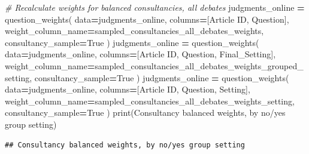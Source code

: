 \documentclass[
]{article}
\newenvironment{Shaded}{\begin{snugshade}}{\end{snugshade}}
\newcommand{\BuiltInTok}[1]{#1}
\newcommand{\CommentTok}[1]{\textcolor[rgb]{0.56,0.35,0.01}{\textit{#1}}}
\newcommand{\NormalTok}[1]{#1}
\newcommand{\OperatorTok}[1]{\textcolor[rgb]{0.81,0.36,0.00}{\textbf{#1}}}
\newcommand{\StringTok}[1]{\textcolor[rgb]{0.31,0.60,0.02}{#1}}
\newcommand{\VariableTok}[1]{\textcolor[rgb]{0.00,0.00,0.00}{#1}}
\begin{document}
\begin{Shaded}
\begin{Highlighting}[]
\CommentTok{\# Recalculate weights for balanced consultancies, all debates}
\NormalTok{judgments\_online }\OperatorTok{=}\NormalTok{ question\_weights(}
\NormalTok{    data}\OperatorTok{=}\NormalTok{judgments\_online, }
\NormalTok{    columns}\OperatorTok{=}\NormalTok{[}\StringTok{\textquotesingle{}Article ID\textquotesingle{}}\NormalTok{, }\StringTok{\textquotesingle{}Question\textquotesingle{}}\NormalTok{], }
\NormalTok{    weight\_column\_name}\OperatorTok{=}\StringTok{\textquotesingle{}sampled\_consultancies\_all\_debates\_weights\textquotesingle{}}\NormalTok{,}
\NormalTok{    consultancy\_sample}\OperatorTok{=}\VariableTok{True}
\NormalTok{)}
\NormalTok{judgments\_online }\OperatorTok{=}\NormalTok{ question\_weights(}
\NormalTok{    data}\OperatorTok{=}\NormalTok{judgments\_online, }
\NormalTok{    columns}\OperatorTok{=}\NormalTok{[}\StringTok{\textquotesingle{}Article ID\textquotesingle{}}\NormalTok{, }\StringTok{\textquotesingle{}Question\textquotesingle{}}\NormalTok{, }\StringTok{\textquotesingle{}Final\_Setting\textquotesingle{}}\NormalTok{], }
\NormalTok{    weight\_column\_name}\OperatorTok{=}\StringTok{\textquotesingle{}sampled\_consultancies\_all\_debates\_weights\_grouped\_setting\textquotesingle{}}\NormalTok{,}
\NormalTok{    consultancy\_sample}\OperatorTok{=}\VariableTok{True}
\NormalTok{)}
\NormalTok{judgments\_online }\OperatorTok{=}\NormalTok{ question\_weights(}
\NormalTok{    data}\OperatorTok{=}\NormalTok{judgments\_online, }
\NormalTok{    columns}\OperatorTok{=}\NormalTok{[}\StringTok{\textquotesingle{}Article ID\textquotesingle{}}\NormalTok{, }\StringTok{\textquotesingle{}Question\textquotesingle{}}\NormalTok{, }\StringTok{\textquotesingle{}Setting\textquotesingle{}}\NormalTok{], }
\NormalTok{    weight\_column\_name}\OperatorTok{=}\StringTok{\textquotesingle{}sampled\_consultancies\_all\_debates\_weights\_setting\textquotesingle{}}\NormalTok{,}
\NormalTok{    consultancy\_sample}\OperatorTok{=}\VariableTok{True}
\NormalTok{)}
\BuiltInTok{print}\NormalTok{(}\StringTok{\textquotesingle{}Consultancy balanced weights, by no/yes group setting\textquotesingle{}}\NormalTok{)}
\end{Highlighting}
\end{Shaded}

\begin{verbatim}
## Consultancy balanced weights, by no/yes group setting
\end{verbatim}
\end{document}
